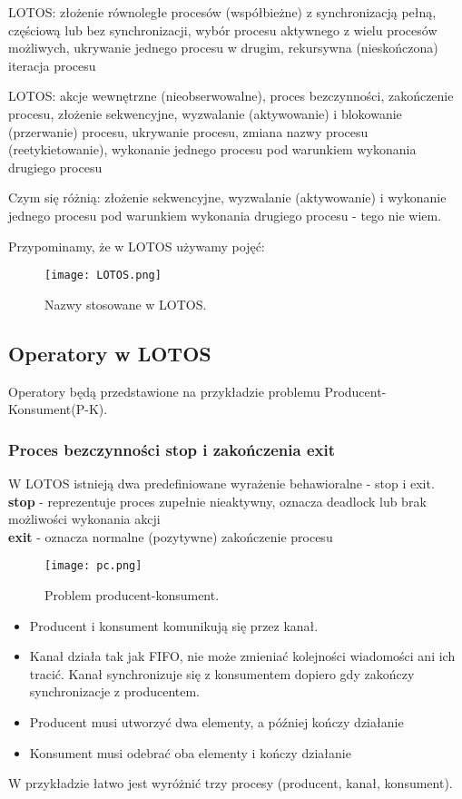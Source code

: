 \documentclass[a4paper,15pt]{article}
\newcommand{\example}[2]{
    \begin{tcolorbox}[colback=blue!5!white,colframe=blue,title={Przykład #1}]
        #2
    \end{tcolorbox}
}
\newcommand{\issue}[2]{
    \begin{tcolorbox}[colback=issueColor!5!white,colframe=issueColor,title={Zagadnienie #1}]
        #2
    \end{tcolorbox}
}
\begin{document}
\issue{5}{
LOTOS: złożenie równoległe procesów (współbieżne) z synchronizacją
pełną, częściową lub bez synchronizacji, wybór procesu aktywnego z wielu
procesów możliwych, ukrywanie jednego procesu w drugim, rekursywna
(nieskończona) iteracja procesu
}


\issue{8}{
LOTOS: akcje wewnętrzne (nieobserwowalne), proces bezczynności,
zakończenie procesu, złożenie sekwencyjne, wyzwalanie (aktywowanie) i
blokowanie (przerwanie) procesu, ukrywanie procesu, zmiana nazwy procesu
(reetykietowanie), wykonanie jednego procesu pod warunkiem wykonania
drugiego procesu
}

Czym się różnią: złożenie sekwencyjne, wyzwalanie (aktywowanie) i wykonanie jednego procesu pod warunkiem wykonania
drugiego procesu - tego nie wiem. 

Przypominamy, że w LOTOS używamy pojęć:
\begin{figure}[H]
\centerline{\texttt{[image: LOTOS.png]}}
\caption{Nazwy stosowane w LOTOS.}
\label{fig:nazwyLOTOS}
\end{figure}


\subsection{Operatory w LOTOS}
Operatory będą przedstawione na przykładzie problemu Producent-Konsument(P-K). \\


\subsubsection{Proces bezczynności stop i zakończenia exit}
W LOTOS istnieją dwa predefiniowane wyrażenie behawioralne - stop i exit. \\
\textbf{stop} - reprezentuje proces zupełnie nieaktywny, oznacza deadlock lub brak możliwości wykonania akcji \\
\textbf{exit} - oznacza normalne (pozytywne) zakończenie procesu



\example{Producent-Konsument}{

\begin{figure}[H]
\centerline{\texttt{[image: pc.png]}}
\caption{Problem producent-konsument.}
\label{fig:pc}
\end{figure}
\begin{itemize}
\item Producent i konsument komunikują się przez kanał. 
\item Kanał działa tak jak FIFO, nie może zmieniać kolejności wiadomości ani ich tracić. Kanał synchronizuje się z konsumentem dopiero gdy zakończy synchronizacje z producentem.  
\item Producent musi utworzyć dwa elementy, a później kończy działanie
\item Konsument musi odebrać oba elementy i kończy działanie
\end{itemize}
W przykładzie łatwo jest wyróżnić trzy procesy (producent, kanał, konsument).
}
\end{document}
